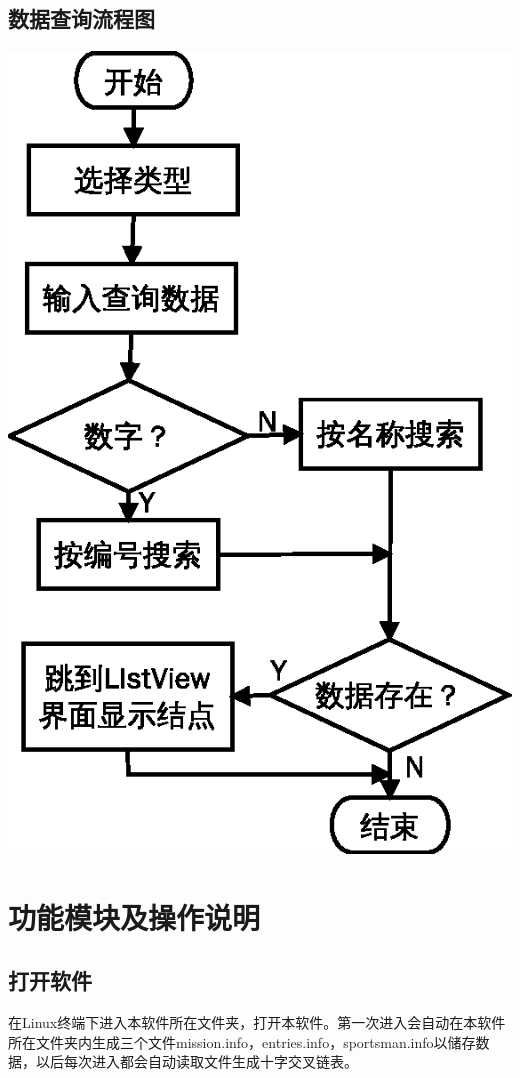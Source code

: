\documentclass[10pt,a4paper]{article}
\begin{document}
\subsection{数据查询流程图}
\begin{center}
\includegraphics{uml2}
\newline
\end{center}
\section{功能模块及操作说明}
\subsection{打开软件}
在Linux终端下进入本软件所在文件夹，打开本软件。第一次进入会自动在本软件所在文件夹内生成三个文件mission.info，entries.info，sportsman.info以储存数据，以后每次进入都会自动读取文件生成十字交叉链表。
\end{document}
